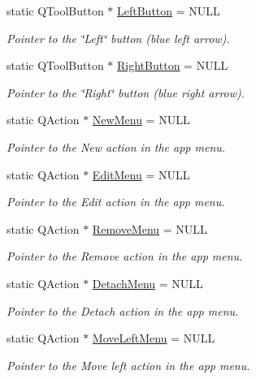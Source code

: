 \begin{DoxyCompactItemize}
static Q\-Tool\-Button $\ast$ \hyperlink{struct_calendar_tools_ab71ef476286fc32d4279dcb56ba670d5}{Left\-Button} = N\-U\-L\-L
\begin{DoxyCompactList}\small\item\em Pointer to the \char`\"{}\-Left\char`\"{} button (blue left arrow). \end{DoxyCompactList}\item 
static Q\-Tool\-Button $\ast$ \hyperlink{struct_calendar_tools_a59954d8547d3129599bd876421dfcc2b}{Right\-Button} = N\-U\-L\-L
\begin{DoxyCompactList}\small\item\em Pointer to the \char`\"{}\-Right\char`\"{} button (blue right arrow). \end{DoxyCompactList}\item 
static Q\-Action $\ast$ \hyperlink{struct_calendar_tools_ad4f631aa1cb1476d18ece1e48980b4c8}{New\-Menu} = N\-U\-L\-L
\begin{DoxyCompactList}\small\item\em Pointer to the New action in the app menu. \end{DoxyCompactList}\item 
static Q\-Action $\ast$ \hyperlink{struct_calendar_tools_a7f5675473159417f0d1fe16888f105b8}{Edit\-Menu} = N\-U\-L\-L
\begin{DoxyCompactList}\small\item\em Pointer to the Edit action in the app menu. \end{DoxyCompactList}\item 
static Q\-Action $\ast$ \hyperlink{struct_calendar_tools_ac969b2f3e0a0b9a6f216775d98e1fa6b}{Remove\-Menu} = N\-U\-L\-L
\begin{DoxyCompactList}\small\item\em Pointer to the Remove action in the app menu. \end{DoxyCompactList}\item 
static Q\-Action $\ast$ \hyperlink{struct_calendar_tools_a09210d97a0a3aaf912aaa2389a076ff3}{Detach\-Menu} = N\-U\-L\-L
\begin{DoxyCompactList}\small\item\em Pointer to the Detach action in the app menu. \end{DoxyCompactList}\item 
static Q\-Action $\ast$ \hyperlink{struct_calendar_tools_a174a6b8b94ae40062c8524780e62e711}{Move\-Left\-Menu} = N\-U\-L\-L
\begin{DoxyCompactList}\small\item\em Pointer to the Move left action in the app menu. \end{DoxyCompactList}\item 

\end{DoxyCompactItemize}
